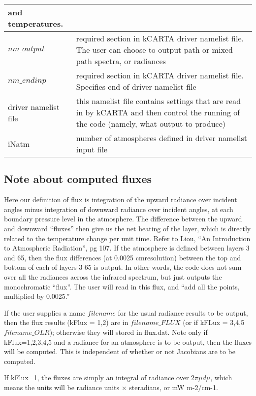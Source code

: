 \documentclass[12pt]{article}
\newcommand{\kc}{\textsf{kCARTA}\xspace}
\newcommand{\cm}{\hbox{cm}}
\newlength{\colwidth}
\begin{document}
\begin{longtable}{|l|p{\colwidth}|}
                and temperatures.\\ \hline
$nm\_output$ & required section in \kc driver namelist file.  The user can 
            choose to output path or mixed path spectra, or radiances\\ \hline
$nm\_endinp$ & required section in \kc driver namelist file.  Specifies end of 
         driver namelist file\\
\hline
driver namelist file & this namelist file contains settings that are read in 
            by  \kc  and then control the running of the code 
            (namely, what output to produce)\\ \hline
iNatm     & number of atmospheres defined in driver namelist input file\\ 
            \hline
\end{longtable}

\subsection{Note about computed fluxes}
Here our definition of flux is integration of the upward radiance over 
incident angles minus integration of downward radiance over incident angles,
at each boundary pressure level in the atmosphere. The difference between the
upward and downward ``fluxes'' then give us the net heating of the layer, 
which is directly related to the temperature change per unit time.  Refer to 
Liou,  ``An Introduction to Atmospheric Radiation'', pg 107. If the 
atmosphere is defined between layers 3 and 65, then the flux differences 
(at 0.0025 \cm resolution) between the top and bottom of each of layers 
3-65 is output. In other words, the code does not sum over all the radiances 
across the infrared spectrum, but just outputs the monochromatic ``flux''. The
user will read in this flux, and ``add all the points, multiplied by 0.0025.''

If the user supplies a name $filename$ for the usual radiance 
results to be output, then the flux results (kFlux = 1,2) are in 
$filename\_FLUX$ (or if kFLux = 3,4,5 $filename\_OLR$); otherwise
they will stored in flux.dat. Note only if kFlux=1,2,3,4,5 and a radiance for
an atmosphere is to be output, then the fluxes will be computed. This is 
independent of whether or not Jacobians are to be computed. 

If kFlux=1, the fluxes are simply an integral of radiance over 
$2 \pi \mu d\mu$, which means the units will be radiance units $\times$ 
steradians, or mW m-2/cm-1. 
\end{document}
